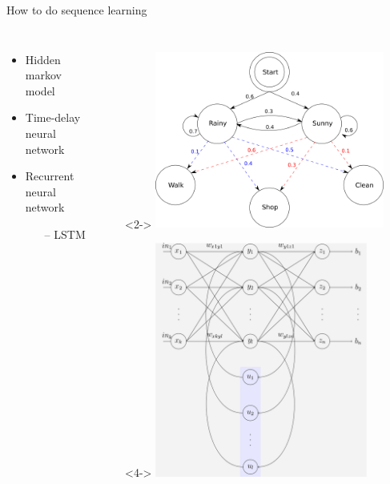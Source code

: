 \documentclass[11pt,center]{beamer}
\begin{document}
\begin{frame}{How to do sequence learning}
  \begin{columns}
	\begin{itemize}
	  \item<2-> Hidden markov model
	  \item<3-> Time-delay neural network
	  \item<4-> Recurrent neural network
		\begin{itemize}
		  \item[--] LSTM
		\end{itemize}
	\end{itemize}
	\begin{itemize}
	  \item[]<2-> \includegraphics[width=0.8\textwidth]{../pics/hmm2}
	  \item[]<4-> \includegraphics[width=0.74\textwidth]{../pics/rnn}
	\end{itemize}
  \end{columns}
\end{frame}
\end{document}
